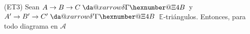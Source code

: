 \documentclass[preview]{standalone}
\makeatletter
\newcommand*{\da@xarrow}[7]{%
                                 \sbox0{$\ifx#7\scriptstyle\scriptscriptstyle\else\scriptstyle\fi#5#1#6\m@th$}%
                                 \sbox2{$\ifx#7\scriptstyle\scriptscriptstyle\else\scriptstyle\fi#5#2#6\m@th$}%
                                 \sbox4{$#7\dabar@\m@th$}%
                                 \dimen@=\wd0 %
                                 \ifdim\wd2 >\dimen@
                                   \dimen@=\wd2 %
                                 \fi
                                 \count@=2 %
                                 \def\da@bars{\dabar@\dabar@}%
                                 \@whiledim\count@\wd4<\dimen@\do{%
                                   \advance\count@\@ne
                                   \expandafter\def\expandafter\da@bars\expandafter{%
                                     \da@bars
                                     \dabar@ 
                                   }%
                                 }%
                                 \mathrel{#3}%
                                 \mathrel{%
                                   \mathop{\da@bars}\limits
                                   \ifx\\#1\\%
                                   \else
                                     _{\copy0}%
                                   \fi
                                   \ifx\\#2\\%
                                   \else
                                     ^{\copy2}%
                                   \fi
                                 }%
                                 \mathrel{#4}%
                               }
\newcommand*{\da@rightarrow}{\mathchar"0\hexnumber@\symAMSa 4B }
\newcommand*{\xdashrightarrow}[2][]{%
                                 \mathrel{%
                                   \mathpalette{\da@xarrow{#1}{#2}{}\da@rightarrow{\,}{}}{}%
                                 }%
                               }
\makeatother
\begin{document}
\begin{center}
(ET3) Sean \hspace{0.5mm} $A\to B\to C\xdashrightarrow{\delta}$ \hspace{0.5mm} y \hspace{0.5mm} $A'\to B'\to C'\xdashrightarrow{\delta'}$ \hspace{0.5mm} $\mathbb{E}$-triángulos. Entonces, para todo diagrama en $\mathscr{A}$
\end{center}
\end{document}
